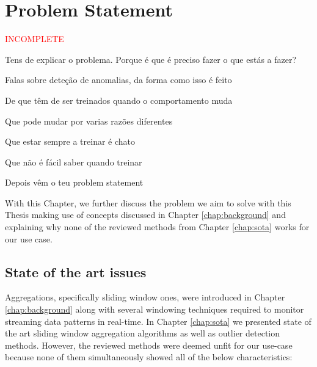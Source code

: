 \chapter{Problem Statement} \label{chap:statement} \minitoc

\textcolor{red}{INCOMPLETE}

Tens de explicar o problema. Porque é que é preciso fazer o que estás a fazer?



Falas sobre deteção de anomalias, da forma como isso é feito



De que têm de ser treinados quando o comportamento muda



Que pode mudar por varias razões diferentes



Que estar sempre a treinar é chato



Que não é fácil saber quando treinar



Depois vêm o teu problem statement






With this Chapter, we further discuss the problem we aim to solve with this Thesis making use of concepts discussed in Chapter \ref{chap:background} and explaining why none of the reviewed methods from Chapter \ref{chap:sota} works for our use case.

\section{State of the art issues}
Aggregations, specifically sliding window ones, were introduced in Chapter \ref{chap:background} along with several windowing techniques required to monitor streaming data patterns in real-time. In Chapter \ref{chap:sota} we presented state of the art sliding window aggregation algorithms as well as outlier detection methods. However, the reviewed methods were deemed unfit for our use-case because none of them simultaneously showed all of the below characteristics:

